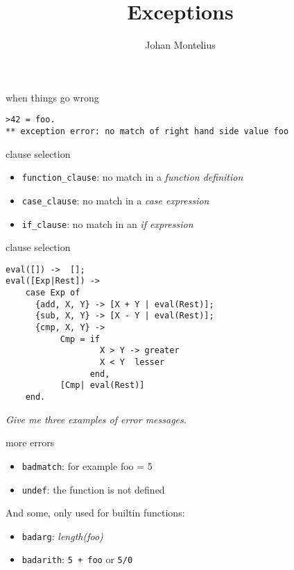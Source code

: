 

\title[ID1019 Exceptions]{Exceptions}


\author{Johan Montelius}
\date{\semester}



\begin{frame}
\titlepage
\end{frame}

\begin{frame}[fragile]{when things go wrong}

\begin{verbatim}
>42 = foo.
** exception error: no match of right hand side value foo
\end{verbatim}
\end{frame}

\begin{frame}{clause selection}

\begin{itemize}
\item {\tt function\_clause}:  no match in a {\em function definition}
\pause
\item {\tt case\_clause}: no match in a {\em case expression}
\pause
\item {\tt if\_clause}: no match in an {\em if expression}
\end{itemize}
\end{frame}

\begin{frame}[fragile]{clause selection}

\begin{verbatim}
eval([]) ->  [];
eval([Exp|Rest]) ->
    case Exp of
      {add, X, Y} -> [X + Y | eval(Rest)];
      {sub, X, Y} -> [X - Y | eval(Rest)];
      {cmp, X, Y} -> 
           Cmp = if 
                   X > Y -> greater
                   X < Y  lesser
                 end,
           [Cmp| eval(Rest)]
    end.
\end{verbatim}

\pause\vspace{20pt}
{\em Give me three examples of error messages.}
\end{frame}

\begin{frame}{more errors}

\begin{itemize}
\item {\tt badmatch}: for example foo = 5
\pause
\item {\tt undef}: the function is not defined
\end{itemize}
\pause\vspace{20pt}

And some, only used for builtin functions:
\pause

\begin{itemize}
\item {\tt badarg}: {\em length(foo)}
\pause
\item {\tt badarith}: {\tt 5 + foo} or {\tt 5/0}
\end{itemize}

\end{frame}

